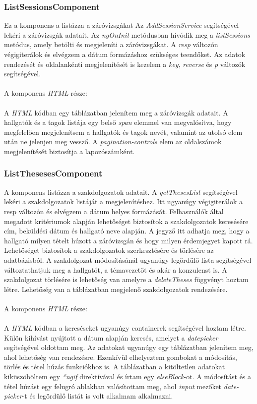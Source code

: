 \subsubsection{ListSessionsComponent}

Ez a komponens a listázza a záróvizsgákat Az \textit{AddSessionService} segítségével lekéri a záróvizsgák adatait. Az \textit{ngOnInit} metódusban hívódik meg a \textit{listSessions} metódus, amely betölti és megjeleníti a záróvizsgákat. A \textit{resp} változón végigiterálok és elvégzem a dátum formázáshoz szükséges teendőket. Az adatok rendezését és oldalankénti megjelenítését is kezelem a \textit{key}, \textit{reverse} és \textit{p} változók segítségével.\\
\\
A komponens \textit{HTML} része:\\
\\
A \textit{HTML} kódban egy táblázatban jelenítem meg a záróvizsgák adatait.  A hallgatók és a tagok listája egy belső \textit{span} elemmel van megvalósítva, hogy megfelelően megjelenítsem a hallgatók és tagok nevét, valamint az utolsó elem után ne jelenjen meg vessző. A \textit{pagination-controls} elem az oldalszámok megjelenítését biztosítja a lapozószámként.

\subsubsection{ListThesesesComponent}

A komponens listázza a szakdolgozatok adatait. A \textit{getThesesList} segítségével lekéri a szakdolgozatok listáját a megjelenítéshez. Itt ugyanúgy végigiterálok a resp változón és elvégzem a dátum helyes formázását. Felhasználók által megadott kritériumok alapján lehetőséget biztosítok a szakdolgozatok keresésére cím, beküldési dátum és hallgató neve alapján. A jegyző itt adhatja meg, hogy a hallgató milyen tételt húzott a záróvizsgán és hogy milyen érdemjegyet kapott rá. Lehetőséget biztosítok a szakdolgozatok szerkesztésére és törlésére az adatbázisból. A szakdolgozat módosításánál ugyanúgy legördülő lista segítségével változtathatjuk meg a hallgatót, a témavezetőt és akár a konzulenst is. A szakdolgozat törlésére is lehetőség van amelyre a \textit{deleteTheses} függvényt hoztam létre. Lehetőség van a táblázatban megjelenő szakdolgozatok rendezésére. \\
\\
A komponens \textit{HTML} része:\\
\\
A \textit{HTML} kódban a kereséseket ugyanúgy containerek segítségével hoztam létre.
Külön kihívást nyújtott a dátum alapján keresés, amelyet a \textit{datepicker} segítségével oldottam meg. Az adatokat ugyanúgy egy táblázatban jelenítem meg, ahol lehetőség van rendezésre. Ezenkívül elhelyeztem gombokat a módosítás, törlés és tétel húzás funkciókhoz is. A táblázatban a kitöltetlen adatokat kiküszöböltem egy \textit{*ngif} direktívával és írtam egy \textit{elseBlock}-ot. A módosítást és a tétel húzást egy felugró ablakban valósítottam meg, ahol \textit{input} mezőket \textit{date-picker}-t és legördülő listát is volt alkalmam alkalmazni.


